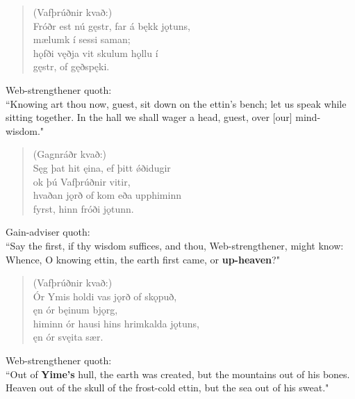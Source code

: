 \begin{verse}
(Vafþrúðnir kvað:) \\%
\bva Fróðr est nú gęstr, \hld far á bękk jǫtuns, \\%
\ind mælumk í sessi saman; \\%
hǫfði vęðja \hld vit skulum hǫllu í \\%
\ind gęstr, of gęðspęki.\\%
\end{verse}

\bvb Web-strengthener quoth: \\ “Knowing art thou now, guest, sit down on the ettin's bench; let us speak while sitting together. In the hall we shall wager a head, guest, over [our] mind-wisdom." \\

\begin{verse}
(Gagnráðr kvað:) \\%
\bva Sęg þat hit ęina, \hld ef þitt ǿði\footnotemark[10] dugir \\%
\ind ok þú Vafþrúðnir vitir, \\%
hvaðan jǫrð of kom \hld eða upphiminn \\%
\ind fyrst, hinn fróði jǫtunn.\\%
\end{verse}

\bvb Gain-adviser quoth: \\ “Say the first\footnotemark[32], if thy wisdom suffices, and thou, Web-strengthener, might know: Whence, O knowing ettin, the earth first came, or \textbf{up-heaven}?" \\

\begin{verse}
(Vafþrúðnir kvað:) \\%
\bva Ór Ymis holdi \hld vas jǫrð of skǫpuð, \\%
\ind ęn ór bęinum bjǫrg, \\%
himinn ór hausi \hld hins hrimkalda jǫtuns, \\%
\ind ęn ór svęita sær.\\%
\end{verse}

\bvb Web-strengthener quoth: \\ “Out of \textbf{Yime's} hull\footnotemark[35], the earth was created, but the mountains out of his bones. Heaven out of the skull of the frost-cold ettin, but the sea out of his sweat.\footnotemark[36]" \\

